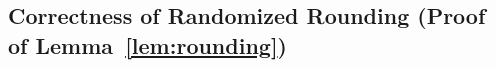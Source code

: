 \subsection{Correctness of Randomized Rounding (Proof of Lemma~\ref{lem:rounding})}
\label{sec:rounding-proof}
